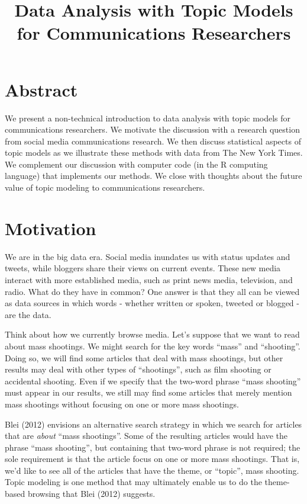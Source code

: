 \documentclass[12pt,]{article}
\title{Data Analysis with Topic Models for Communications Researchers}
\author{}
\date{}
\begin{document}
\maketitle

\pagestyle{fancy}

\listoftodos

\section{Abstract}\label{abstract}

We present a non-technical introduction to data analysis with topic
models for communications researchers. We motivate the discussion with a
research question from social media communications research. We then
discuss statistical aspects of topic models as we illustrate these
methods with data from The New York Times. We complement our discussion
with computer code (in the R computing language) that implements our
methods. We close with thoughts about the future value of topic modeling
to communications researchers.

\section{Motivation}\label{motivation}


We are in the big data era. Social media inundates us with status
updates and tweets, while bloggers share their views on current events.
These new media interact with more established media, such as print news
media, television, and radio. What do they have in common? One answer is
that they all can be viewed as data sources in which words - whether
written or spoken, tweeted or blogged - are the data.

Think about how we currently browse media. Let's suppose that we want to
read about mass shootings. We might search for the key words ``mass''
and ``shooting''. Doing so, we will find some articles that deal with
mass shootings, but other results may deal with other types of
``shootings'', such as film shooting or accidental shooting. Even if we
specify that the two-word phrase ``mass shooting'' must appear in our
results, we still may find some articles that merely mention mass
shootings without focusing on one or more mass shootings.

Blei (2012) envisions an alternative search strategy in which we search
for articles that are \emph{about} ``mass shootings''. Some of the
resulting articles would have the phrase ``mass shooting'', but
containing that two-word phrase is not required; the sole requirement is
that the article focus on one or more mass shootings. That is, we'd like
to see all of the articles that have the theme, or ``topic'', mass
shooting. Topic modeling is one method that may ultimately enable us to
do the theme-based browsing that Blei (2012) suggests.
\end{document}

